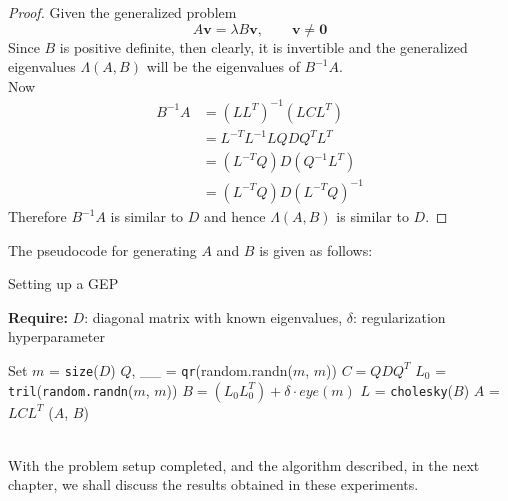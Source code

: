 \begin{proof}
	Given the generalized problem
	\begin{equation}
		A \mathbf{v} = \lambda B \mathbf{v}, \qquad \mathbf{v} \neq \mathbf{0}
	\end{equation}
	Since $B$ is positive definite, then clearly, it is invertible and the generalized eigenvalues $\Lambda(A, B)$ will be the eigenvalues of $B^{-1}A$.\\
	Now
	\begin{align*}
		B^{-1}A & = (LL^T)^{-1}(LCL^T)\\
		& = L^{-T}L^{-1}LQDQ^{T}L^T\\
		& = (L^{-T}Q)D(Q^{-1}L^{T}) \\
		& = (L^{-T}Q)D(L^{-T}Q)^{-1}
	\end{align*}
	Therefore $B^{-1}A$ is similar to $D$ and hence $\Lambda(A,B)$ is similar to $D$.
\end{proof}
The pseudocode for generating $A$ and $B$ is given as follows:
\begin{algorithm}
	\caption{Setting up a GEP}
	\label{alg:problem setup}
	
	\textbf{Require:} \( D \): diagonal matrix with known eigenvalues, \(\delta\): regularization hyperparameter
	\begin{algorithmic}[1]
		\State Set $m$ = \texttt{size}($D$)
		\State $Q$, \_\_ = \texttt{qr}(random.randn($m$, $m$))
		\State $C = QDQ^T$
		\State $L_{0}$ = \texttt{tril}(\texttt{random.randn}($m$, $m$))
		\State $B = (L_0 L_0^T) + \delta \cdot eye (m)$
		\State $L$ = \texttt{cholesky}($B$)
		\State $A$ = $LCL^T$
		\State \Return ($A$, $B$)
		\EndFunction
	\end{algorithmic}
\end{algorithm}\\
With the problem setup completed, and the algorithm described, in the next chapter, we shall discuss the results obtained in these experiments.






















